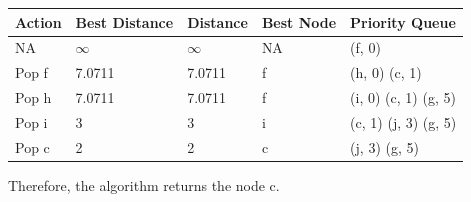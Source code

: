 \documentclass[paper=a4, fontsize=11pt]{scrartcl} %
\numberwithin{equation}{section} %
\numberwithin{figure}{section} %
\numberwithin{table}{section} %
\begin{document}
\begin{center}
    \begin{tabular}{| l | l | l | l | p{6cm} |}
    \hline
    Action & Best Distance & Distance & Best Node & Priority Queue \\ 
    \hline    
    NA & $\infty$ & $\infty$ & NA & (f, 0) \\ 
    \hline    
    Pop f & 7.0711 & 7.0711 & f & (h, 0) (c, 1) \\ 
    \hline    
    Pop h & 7.0711 & 7.0711 & f & (i, 0) (c, 1) (g, 5)  \\
    \hline
    Pop i & 3 & 3 & i & (c, 1) (j, 3) (g, 5) \\
    \hline
    Pop c & 2 & 2 & c & (j, 3) (g, 5) \\
    \hline
    \end{tabular}
\end{center}
Therefore, the algorithm returns the node c. 



\end{document}
